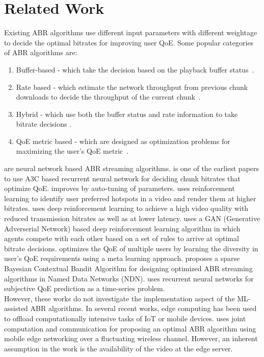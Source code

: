 \section{Related Work}\label{sec:chap05:related_work}
Existing ABR algorithms use different input parameters with different weightage to decide the optimal bitrates for improving user QoE. Some popular categories of \ac{ABR} algorithms are: 
\begin{enumerate}
    \item Buffer-based - which take the decision based on the playback buffer status~\cite{Spiteri2016,Huang2014}.
    \item Rate based - which estimate the network throughput from  previous chunk downloads to decide the throughput of the current chunk~\cite{Jiang2014,Xu2015}.
    \item Hybrid - which use both the buffer status and rate information to take bitrate decisions \cite{Zou2015}.
    \item QoE metric based - which are designed as  optimization problems for maximizing the user's QoE metric~\cite{yin2015control,Qin2018,Qin2019,mao2017neural,Akhtar2018}.
\end{enumerate} 
\cite{mao2017neural,Akhtar2018,Sengupta2018,Bampis2018,8816854,Huang2019} are neural network based \ac{ABR} streaming algorithms.  \cite{mao2017neural} is one of the earliest papers to use A3C based recurrent neural network for deciding chunk bitrates that optimize QoE. \cite{Akhtar2018} improves \cite{mao2017neural} by auto-tuning of parameters. \cite{Sengupta2018} uses reinforcement learning to identify user preferred hotspots in a video and render them at higher bitrates. \cite{Huang2018} uses deep reinforcement learning to achieve a high video quality with reduced transmission bitrates as well as at lower latency. \cite{Huang2019} uses a GAN (Generative Adverserial Network) based deep reinforcement learning algorithm in which agents compete with each other based on a set of rules to arrive at optimal bitrate decisions. \cite{Huo2019} optimizes the QoE of multiple users by learning the diversity in user's QoE requirements using a meta learning approach. \cite{Alt2019} proposes a sparse Bayesian Contextual Bandit Algorithm for designing optimized ABR streaming algorithms in Named Data Networks (NDN). \cite{Bampis2018} uses recurrent neural networks for subjective QoE prediction as a time-series problem.\\
\indent However, these works do not investigate the implementation aspect of the ML-assisted ABR algorithms. In several recent works, edge computing has been used to offload computationally intensive tasks  of IoT or mobile devices. \cite{Guo2019} uses joint computation and communication for proposing an optimal ABR algorithm using mobile edge networking over a fluctuating wireless channel. However, an inherent assumption in the work is the availability of the video at the edge server.\\
